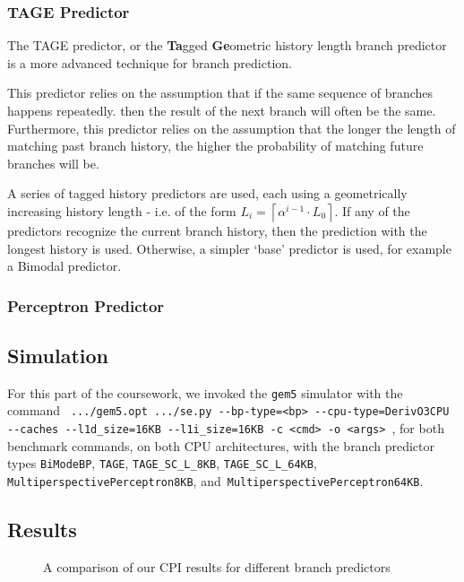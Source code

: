 \subsubsection{TAGE Predictor}
%

The TAGE predictor, or the \textbf{Ta}gged \textbf{Ge}ometric history
length branch predictor is a more advanced technique for branch
prediction.

This predictor relies on the assumption that if the same sequence of
branches happens repeatedly. then the result of the next branch will often
be the same.
Furthermore, this predictor relies on the assumption that the longer
the length of matching past branch history, the higher
the probability of matching future branches will be.\cite{Seznec2006}

A series of tagged history predictors are used, each using a geometrically
increasing history length - i.e. of the form
\(L_i = \left\lceil \alpha^{i-1} \cdot L_0 \right\rceil\).
If any of the predictors recognize the current branch history,
then the prediction with the longest history is used.
Otherwise, a simpler `base' predictor is used, for example a Bimodal
predictor.\cite{Seznec2007}\cite{Michaud2005}

\subsubsection{Perceptron Predictor}


\subsection{Simulation}

For this part of the coursework, we invoked the \texttt{gem5} simulator with the
command \texttt{
    .../gem5.opt~.../se.py
    -{}-bp-type=<bp>
    -{}-cpu-type=DerivO3CPU
    -{}-caches
    -{}-l1d\_size=16KB
    -{}-l1i\_size=16KB
    -c~<cmd>
    -o~<args>
}, for both benchmark commands, on both CPU architectures, with the branch
predictor types \texttt{BiModeBP}, \texttt{TAGE}, \texttt{TAGE\_SC\_L\_8KB},
\texttt{TAGE\_SC\_L\_64KB}, \texttt{MultiperspectivePerceptron8KB},
and~\texttt{MultiperspectivePerceptron64KB}.

\subsection{Results}

\begin{figure}[b]
    \centering
    
    \caption{A comparison of our CPI results for different branch predictors}
    \label{fig:partd-cpi}
\end{figure}


